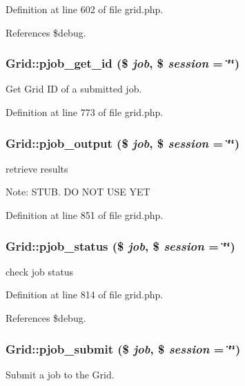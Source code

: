 Definition at line 602 of file grid.php.

References \$debug.
\subsubsection{\setlength{\rightskip}{0pt plus 5cm}Grid::pjob\_\-get\_\-id (\$ {\em job}, \$ {\em session} = \char`\"{}\char`\"{})}\label{classGrid_a15}


Get Grid ID of a submitted job. 



Definition at line 773 of file grid.php.
\subsubsection{\setlength{\rightskip}{0pt plus 5cm}Grid::pjob\_\-output (\$ {\em job}, \$ {\em session} = \char`\"{}\char`\"{})}\label{classGrid_a17}


retrieve results 

\begin{Desc}
\item[Note:]STUB. DO NOT USE YET \end{Desc}


Definition at line 851 of file grid.php.
\subsubsection{\setlength{\rightskip}{0pt plus 5cm}Grid::pjob\_\-status (\$ {\em job}, \$ {\em session} = \char`\"{}\char`\"{})}\label{classGrid_a16}


check job status 



Definition at line 814 of file grid.php.

References \$debug.
\subsubsection{\setlength{\rightskip}{0pt plus 5cm}Grid::pjob\_\-submit (\$ {\em job}, \$ {\em session} = \char`\"{}\char`\"{})}\label{classGrid_a14}


Submit a job to the Grid. 

